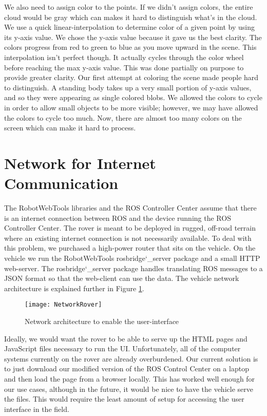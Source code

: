 We also need to assign color to the points.  If we didn't assign colors, the entire cloud would be gray which can makes it hard to distinguish what's in the cloud.  We use a quick linear-interpolation to determine color of a given point by using its y-axis value.  We chose the y-axis value because it gave us the best clarity.  The colors progress from red to green to blue as you move upward in the scene.  This interpolation isn't perfect though.  It actually cycles through the color wheel before reaching the max y-axis value.  This was done partially on purpose to provide greater clarity.  Our first attempt at coloring the scene made people hard to distinguish.  A standing body takes up a very small portion of y-axis values, and so they were appearing as single colored blobs.  We allowed the colors to cycle in order to allow small objects to be more visible; however, we may have allowed the colors to cycle too much.  Now, there are almost too many colors on the screen which can make it hard to process.


\section{Network for Internet Communication}The RobotWebTools libraries and the ROS Controller Center assume that there is an internet connection between ROS and the device running the ROS Controller Center.  The rover is meant to be deployed in rugged, off-road terrain where an existing internet connection is not necessarily available.  To deal with this problem, we purchased a high-power router that sits on the vehicle.  On the vehicle we run the RobotWebTools rosbridge\char`_server package and a small HTTP web-server.  The rosbridge\char`_server package handles translating ROS messages to a JSON format so that the web-client can use the data. The vehicle network architecture is explained further in Figure \ref{fig:NetworkRover}.

\begin{figure}[H]
\centerline{\texttt{[image: NetworkRover]}}
\caption[]{Network architecture to enable the user-interface}
\label{fig:NetworkRover}
\end{figure}

Ideally, we would want the rover to be able to serve up the HTML pages and JavaScript files necessary to run the UI.  Unfortunately, all of the computer systems currently on the rover are already overburdened.  Our current solution is to just download our modified version of the ROS Control Center on a laptop and then load the page from a browser locally.  This has worked well enough for our use cases, although in the future, it would be nice to have the vehicle serve the files.  This would require the least amount of setup for accessing the user interface in the field.